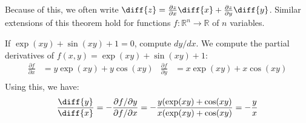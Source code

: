 \documentclass[crop=false,class=book,oneside]{standalone}                      %
\begin{document}
        Because of this, we often write
        $\diff{z}=\frac{\partial{z}}{\partial{x}}\diff{x}%
         +\frac{\partial{z}}{\partial{y}}\diff{y}$.
        Similar extensions of this theorem hold for functions
        $f:\mathbb{R}^{n}\rightarrow\mathbb{R}$ of $n$ variables.
        \begin{example}
            If $\exp(xy)+\sin(xy)+1=0$, compute $dy/dx$. We compute
            the partial derivatives of $f(x,y)=\exp(xy)+\sin(xy)+1$:
            \begin{align*}
                \frac{\partial{f}}{\partial{x}}
                &=y\exp(xy)+y\cos(xy)
                &
                \frac{\partial{f}}{\partial{y}}
                &=x\exp(xy)+x\cos(xy)\\
            \end{align*}
            Using this, we have:
            \begin{equation*}
                \frac{\diff{y}}{\diff{x}}
                =-\frac{\partial{f}/\partial{y}}{\partial{f}/\partial{x}}
                =-\frac{y(\exp(xy)+\cos(xy)}{x(\exp(xy)+\cos(xy)}
                =-\frac{y}{x}
            \end{equation*}
        \end{example}
\end{document}
